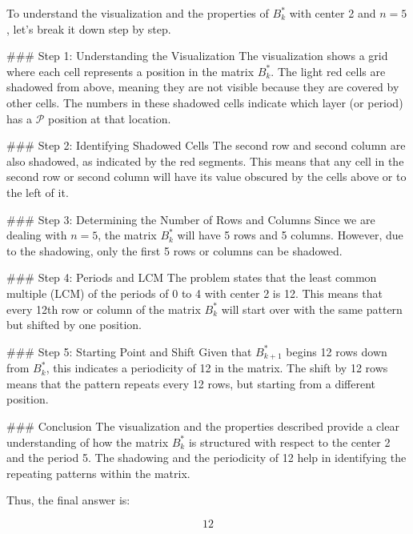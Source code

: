 To understand the visualization and the properties of \( B^*_k \) with center 2 and \( n = 5 \), let's break it down step by step.

### Step 1: Understanding the Visualization
The visualization shows a grid where each cell represents a position in the matrix \( B^*_k \). The light red cells are shadowed from above, meaning they are not visible because they are covered by other cells. The numbers in these shadowed cells indicate which layer (or period) has a \(\mathcal{P}\) position at that location.

### Step 2: Identifying Shadowed Cells
The second row and second column are also shadowed, as indicated by the red segments. This means that any cell in the second row or second column will have its value obscured by the cells above or to the left of it.

### Step 3: Determining the Number of Rows and Columns
Since we are dealing with \( n = 5 \), the matrix \( B^*_k \) will have 5 rows and 5 columns. However, due to the shadowing, only the first 5 rows or columns can be shadowed.

### Step 4: Periods and LCM
The problem states that the least common multiple (LCM) of the periods of 0 to 4 with center 2 is 12. This means that every 12th row or column of the matrix \( B^*_k \) will start over with the same pattern but shifted by one position.

### Step 5: Starting Point and Shift
Given that \( B^*_{k+1} \) begins 12 rows down from \( B^*_k \), this indicates a periodicity of 12 in the matrix. The shift by 12 rows means that the pattern repeats every 12 rows, but starting from a different position.

### Conclusion
The visualization and the properties described provide a clear understanding of how the matrix \( B^*_k \) is structured with respect to the center 2 and the period 5. The shadowing and the periodicity of 12 help in identifying the repeating patterns within the matrix.

Thus, the final answer is:

\[
\boxed{12}
\]